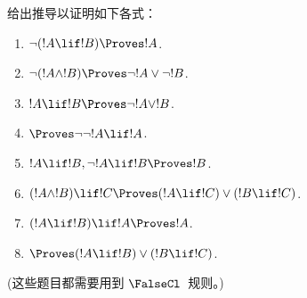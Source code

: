 \documentclass[../../../include/open-logic-section]{subfiles}
\begin{document}
\begin{prob}
给出推导以证明如下各式：
\begin{enumerate}
\item $\lnot(!A \lif !B) \Proves !A$.
\item $\lnot(!A \land !B) \Proves \lnot !A \lor \lnot !B$.
\item $!A \lif !B \Proves \lnot !A \lor !B$.
\item $\Proves \lnot \lnot !A \lif !A$.
\item $!A \lif !B, \lnot !A \lif !B \Proves !B$.
\item $(!A \land !B) \lif !C \Proves (!A \lif !C) \lor (!B \lif !C)$.
\item $(!A \lif !B) \lif !A \Proves !A$.
\item $\Proves (!A \lif !B) \lor (!B \lif !C)$.
\end{enumerate}
(这些题目都需要用到 $\FalseCl$~规则。)
\end{prob}
\end{document}
